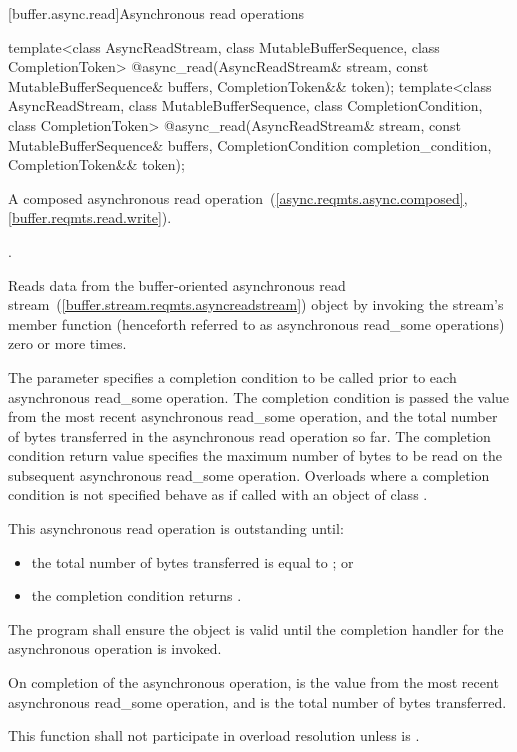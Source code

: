 [buffer.async.read]{Asynchronous read operations}

%
\begin{itemdecl}
template<class AsyncReadStream, class MutableBufferSequence, class CompletionToken>
    @\DEDUCED@ async_read(AsyncReadStream& stream,
                       const MutableBufferSequence& buffers,
                       CompletionToken&& token);
template<class AsyncReadStream, class MutableBufferSequence, class CompletionCondition,
         class CompletionToken>
    @\DEDUCED@ async_read(AsyncReadStream& stream,
                       const MutableBufferSequence& buffers,
                       CompletionCondition completion_condition,
                       CompletionToken&& token);
\end{itemdecl}

\begin{itemdescr}
\pnum
A composed asynchronous read operation~(\ref{async.reqmts.async.composed}, \ref{buffer.reqmts.read.write}).

\pnum
\completionsig {}.

\pnum
\effects Reads data from the buffer-oriented asynchronous read stream~(\ref{buffer.stream.reqmts.asyncreadstream}) object  by invoking the stream's  member function (henceforth referred to as asynchronous read_some operations) zero or more times.

\pnum
The  parameter specifies a completion condition to be called prior to each asynchronous read_some operation. The completion condition is passed the  value from the most recent asynchronous read_some operation, and the total number of bytes transferred in the asynchronous read operation so far. The completion condition return value specifies the maximum number of bytes to be read on the subsequent asynchronous read_some operation. Overloads where a completion condition is not specified behave as if called with an object of class .

\pnum
 This asynchronous read operation is outstanding until:

\begin{itemize}
\item
the total number of bytes transferred is equal to ; or
\item
the completion condition returns .
\end{itemize}

\pnum
The program shall ensure the  object  is valid until the completion handler for the asynchronous operation is invoked.

\pnum
On completion of the asynchronous operation,  is the  value from the most recent asynchronous read_some operation, and  is the total number of bytes transferred.

\pnum
\remarks This function shall not participate in overload resolution unless  is .
\end{itemdescr}

